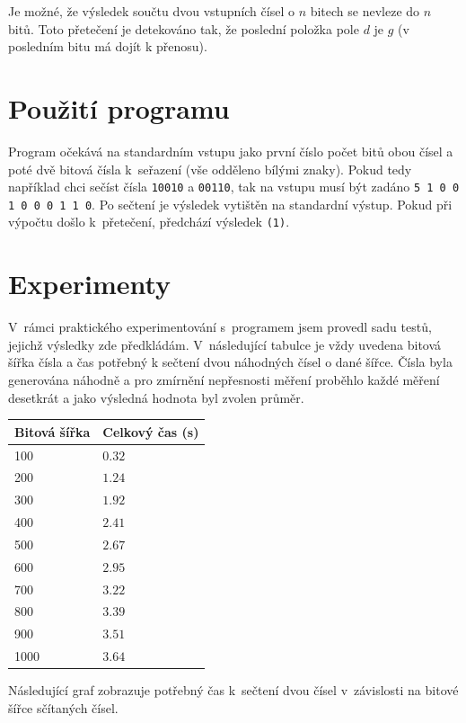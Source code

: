 \documentclass[11pt,a4paper]{article}
\begin{document}
\noindent
Je možné, že výsledek součtu dvou vstupních čísel o $n$ bitech se nevleze
do $n$ bitů. Toto přetečení je detekováno tak, že poslední položka
pole $d$ je $g$ (v posledním bitu má dojít k přenosu).

\section{Použití programu}

Program očekává na standardním vstupu jako první číslo počet bitů obou čísel
a poté dvě bitová čísla k~seřazení (vše odděleno bílými znaky).
Pokud tedy například chci sečíst čísla \texttt{10010} a  \texttt{00110},
tak na vstupu musí být zadáno \texttt{5 1 0 0 1 0 0 0 1 1 0}.
Po sečtení je výsledek vytištěn na standardní výstup.
Pokud při výpočtu došlo k~přetečení, předchází výsledek \texttt{(1)}.

\section{Experimenty}

V~rámci praktického experimentování s~programem jsem provedl sadu testů,
jejichž výsledky zde předkládám. V~následující tabulce je vždy uvedena
bitová šířka čísla a čas potřebný k sečtení dvou náhodných čísel o dané šířce.
Čísla byla generována náhodně a pro zmírnění nepřesnosti měření proběhlo každé
měření desetkrát a jako výsledná hodnota byl zvolen průměr.

\begin{center}
	\begin{tabular}{| l | l |}
	\hline
		Bitová šířka & Celkový čas (s) \\
	\hline
		100 & $0.32$ \\
		200 & $1.24$ \\
		300 & $1.92$ \\
		400 & $2.41$ \\
		500 & $2.67$ \\
		600 & $2.95$ \\
		700 & $3.22$ \\
		800 & $3.39$ \\
		900 & $3.51$ \\
		1000 & $3.64$ \\
	\hline
	\end{tabular}
\end{center}

\noindent
Následující graf zobrazuje potřebný čas k~sečtení dvou čísel v~závislosti
na bitové šířce sčítaných čísel.
\end{document}
